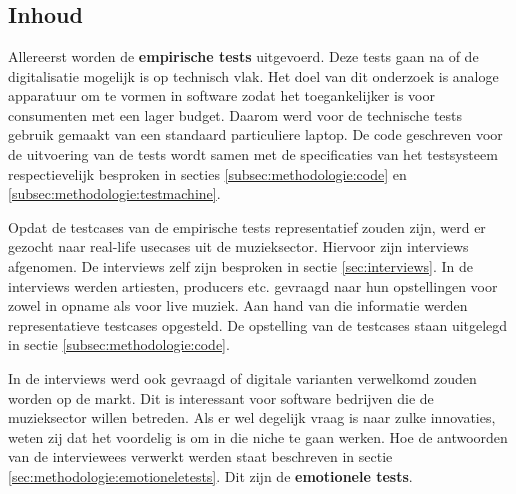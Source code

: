 
\chapter{}
\label{ch:methodologie}


\section{Inhoud}

Allereerst worden de \textbf{empirische tests} uitgevoerd. Deze tests gaan na of de digitalisatie mogelijk is op technisch vlak. Het doel van dit onderzoek is analoge apparatuur om te vormen in software zodat het toegankelijker is voor consumenten met een lager budget. Daarom werd voor de technische tests gebruik gemaakt van een standaard particuliere laptop. De code geschreven voor de uitvoering van de tests wordt samen met de specificaties van het testsysteem respectievelijk besproken in secties \ref{subsec:methodologie:code} en \ref{subsec:methodologie:testmachine}.

Opdat de testcases van de empirische tests representatief zouden zijn, werd er gezocht naar real-life usecases uit de muzieksector. Hiervoor zijn interviews afgenomen. De interviews zelf zijn besproken in sectie \ref{sec:interviews}. In de interviews werden artiesten, producers etc. gevraagd naar hun opstellingen voor zowel in opname als voor live muziek. Aan hand van die informatie werden representatieve testcases opgesteld. De opstelling van de testcases staan uitgelegd in sectie \ref{subsec:methodologie:code}. 

In de interviews werd ook gevraagd of digitale varianten verwelkomd zouden worden op de markt. Dit is interessant voor software bedrijven die de muzieksector willen betreden. Als er wel degelijk vraag is naar zulke innovaties, weten zij dat het voordelig is om in die niche te gaan werken. Hoe de antwoorden van de interviewees verwerkt werden staat beschreven in sectie \ref{sec:methodologie:emotioneletests}. Dit zijn de \textbf{emotionele tests}.

